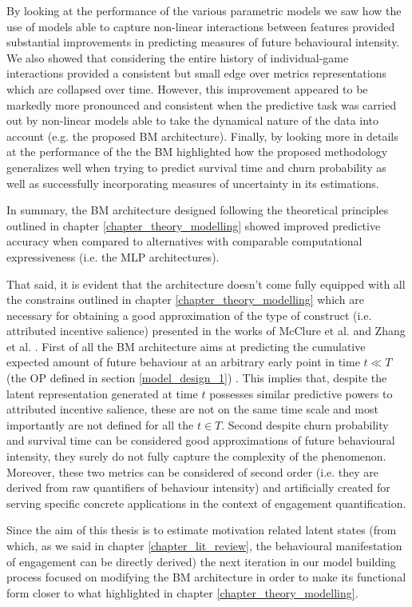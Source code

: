 By looking at the performance of the various parametric models we saw how  the use of models able to capture non-linear interactions between features provided substantial improvements in predicting measures of future behavioural intensity. We also showed that considering the entire history of individual-game interactions provided a consistent but small edge over metrics representations which are collapsed over time. However, this improvement appeared to be markedly more pronounced and consistent when the predictive task was carried out by non-linear models able to take the dynamical nature of the data into account (e.g. the proposed BM architecture). Finally, by looking more in details at the performance of the the BM highlighted how the proposed methodology generalizes well when trying to predict survival time and churn probability as well as successfully incorporating measures of uncertainty in its estimations. 

In summary, the BM architecture designed following the theoretical principles outlined in chapter \ref{chapter_theory_modelling} showed improved predictive accuracy when compared to alternatives with comparable computational expressiveness (i.e. the MLP architectures). 

That said, it is evident that the architecture doesn't come fully equipped with all the constrains outlined in chapter \ref{chapter_theory_modelling}
which are necessary for obtaining a good approximation of the type of construct (i.e. attributed incentive salience) presented in the works of McClure et al. \cite{mcclure2003computational} and Zhang et al. \cite{zhang2009neural}. First of all the BM architecture aims at predicting the cumulative expected amount of future behaviour at an arbitrary early point in time $t \ll T$ (the OP defined in section \ref{model_design_1}) . This implies that, despite the latent representation generated at time $t$ possesses similar predictive powers to attributed incentive salience, these are not on the same time scale and most importantly are not defined for all the $t \in T$. Second despite churn probability and survival time can be considered good approximations of future behavioural intensity, they surely do not fully capture the complexity of the phenomenon. Moreover, these two metrics can be considered of second order (i.e. they are derived from raw quantifiers of behaviour intensity) and artificially created for serving specific concrete applications in the context of engagement quantification. 

Since the aim of this thesis is to estimate motivation related latent states (from which, as we said in chapter \ref{chapter_lit_review}, the behavioural manifestation of engagement can be directly derived) the next iteration in our model building process focused on modifying the BM architecture in order to make its functional form closer to what highlighted in chapter \ref{chapter_theory_modelling}.

